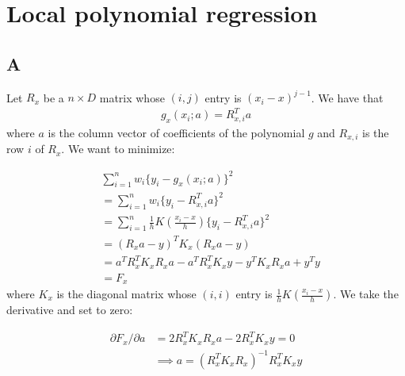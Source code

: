\documentclass{article}
\begin{document}
\section*{Local polynomial regression}
\subsection*{A}
Let \(R_{x}\) be a \(n \times D\) matrix whose \( (i,j) \) entry is \( (x_i - x)^{j-1}\). We have that
\begin{align*}
g_x(x_i; a) = R_{x,i}^T a
\end{align*}
where \(a\) is the column vector of coefficients of the polynomial \(g\) and \(R_{x,i} \) is the row \(i\) of \(R_{x}\). We want to minimize:

\begin{align*}
&\sum_{i=1}^n w_i \{y_i - g_x(x_i; a)\}^2\\
&= \sum_{i=1}^n w_i \{y_i - R_{x,i}^T a\}^2\\
&= \sum_{i=1}^n \frac{1}{h}K\left(\frac{x_i - x}{h}\right)  \{y_i - R_{x,i}^T a\}^2\\
&= (R_x a - y)^T K_x (R_x a - y)\\
&= a^TR_x^T K_x R_x a  - a^TR_x^T K_x y -  y^T K_x R_x a + y^Ty\\
&= F_x
\end{align*}
where \(K_x\) is the diagonal matrix whose \( (i,i) \) entry is \(\frac{1}{h}K(\frac{x_i - x}{h})\).
We take the derivative and set to zero:

\begin{align*}
\partial F_x / \partial a &= 2 R_x^T K_x R_x a - 2 R_x^T K_x y = 0\\
&\implies a= (R_x^T K_x R_x)^{-1} R_x^T K_x y
\end{align*}
\end{document}
